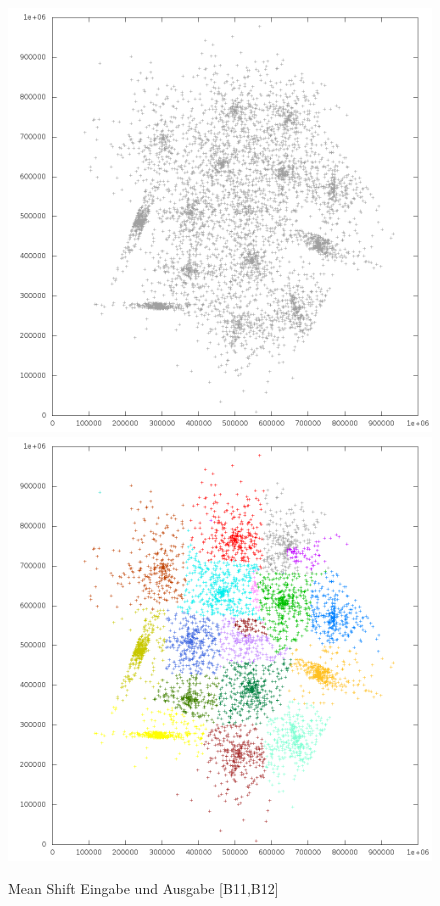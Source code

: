 \documentclass[10pt,utf8]{beamer}
\begin{document}
\begin{frame}
	\centering
	\begin{figure}[p!]
		\vspace{-10pt}
		\hspace{-25pt}
		\includegraphics[scale=0.23, keepaspectratio]{../output/pics/s4_black.png}
		\includegraphics[scale=0.23, keepaspectratio]{../output/pics/s4_colored.png}
		\caption{Mean Shift Eingabe und Ausgabe [B11,B12]}
	\end{figure}
\end{frame}
\end{document}
